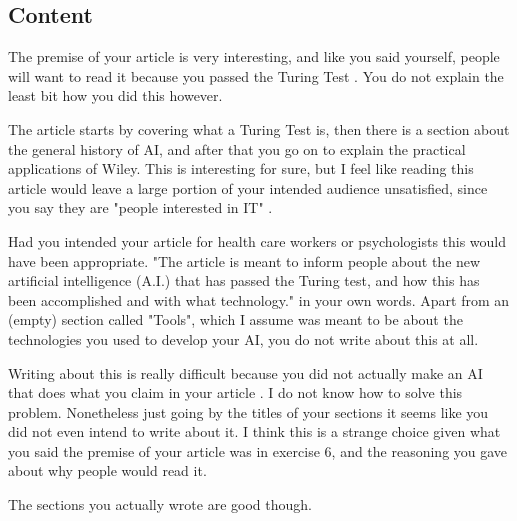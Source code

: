 \documentclass[12pt, a4paper]{article}
\begin{document}
\subsection{Content}
The premise of your article is very interesting, and like you said yourself, people will want to read it because you passed the Turing Test \cite{mick}. You do not explain the least bit how you did this however.

The article starts by covering what a Turing Test is, then there is a section about the general history of AI, and after that you go on to explain the practical applications of Wiley. This is interesting for sure, but I feel like reading this article would leave a large portion of your intended audience unsatisfied, since you say they are "people interested in IT" \cite{mick}.

Had you intended your article for health care workers or psychologists this would have been appropriate. "The article is meant to inform people about the new artificial intelligence (A.I.)
that has passed the Turing test, and how this has been accomplished and with
what technology." \cite{mick} in your own words. Apart from an (empty) section called "Tools", which I assume was meant to be about the technologies you used to develop your AI, you do not write about this at all.

Writing about this is really difficult because you did not actually make an AI that does what you claim in your article \cite{mick}. I do not know how to solve this problem. Nonetheless just going by the titles of your sections it seems like you did not even intend to write about it. I think this is a strange choice given what you said the premise of your article was in exercise 6, and the reasoning you gave about why people would read it.

The sections you actually wrote are good though.

\printbibliography
\end{document}
